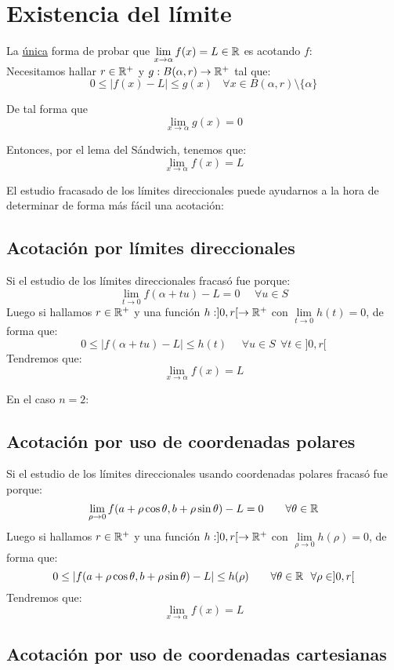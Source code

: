 \section{Existencia del límite}

La \underline{única} forma de probar que $\lim\limits_{x \to \alpha}f(x) = L \in \mathbb R$ es acotando $f$:\\


Necesitamos hallar $r \in \mathbb R^{+}$ y $g:B(\alpha,r)\rightarrow \mathbb R^{+}$ tal que:
$$0 \leq \left| f(x) - L \right| \leq g(x) ~~~~\forall x \in B(\alpha,r)\setminus\{\alpha\}$$

De tal forma que $$\lim_{x \to \alpha}g(x) = 0$$


Entonces, por el lema del Sándwich, tenemos que:
$$\lim_{x \to \alpha}f(x) = L$$


El estudio fracasado de los límites direccionales puede ayudarnos a la hora de determinar de
forma más fácil una acotación:

\subsection{Acotación por límites direccionales}

Si el estudio de los límites direccionales fracasó fue porque:
$$\lim_{t \to 0}f(\alpha + tu)-L = 0~~~~~~\forall u \in S$$
Luego si hallamos $r \in \mathbb R^{+}$ y una función $h:]0,r[\rightarrow \mathbb R^{+}$ con $\lim\limits_{t\to 0}h(t) = 0$,
de forma que:
$$0 \leq |f(\alpha + tu)-L| \leq h(t)~~~~~~\forall u \in S~~\forall t \in ]0,r[$$
Tendremos que: $$\lim_{x \to \alpha}f(x) = L$$


En el caso $n=2$:
\subsection{Acotación por uso de coordenadas polares}

Si el estudio de los límites direccionales usando coordenadas polares fracasó fue porque:
$$\lim_{\rho \to 0}f(a + \rho \cos\theta, b + \rho \sin\theta)-L = 0~~~~~~\forall \theta \in \mathbb R$$
Luego si hallamos $r \in \mathbb R^{+}$ y una función $h:]0,r[\rightarrow \mathbb R^{+}$ con $\lim\limits_{\rho\to 0}h(\rho) = 0$,
de forma que:
$$0 \leq |f(a+\rho \cos\theta,b+\rho \sin\theta)-L| \leq h(\rho)~~~~~~\forall \theta \in \mathbb R~~\forall \rho \in ]0,r[$$
Tendremos que: $$\lim_{x \to \alpha}f(x) = L$$

\subsection{Acotación por uso de coordenadas cartesianas}

